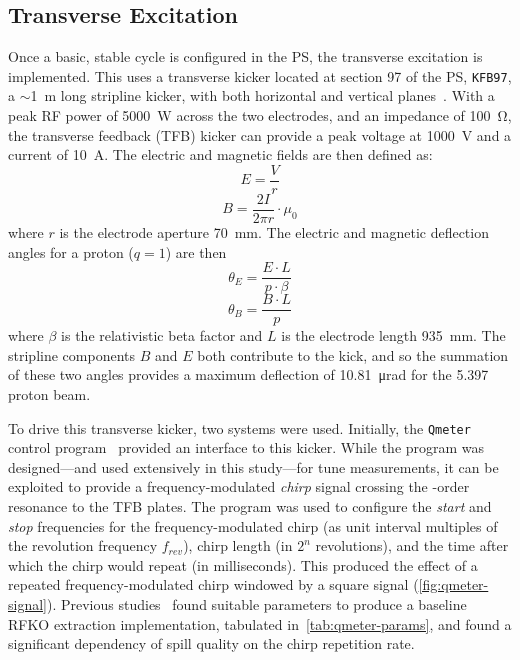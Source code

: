 \documentclass[a4paper,twoside,11pt]{report}
\begin{document}
\subsection{Transverse Excitation}\label{sec:trans_exc}
Once a basic, stable cycle is configured in the PS, the transverse excitation is implemented. This uses a transverse kicker located at section 97 of the PS, \verb|KFB97|, a $\sim$\qty{1}{\meter} long stripline kicker, with both horizontal and vertical planes~\cite{Sterbini:2158994}. With a peak RF power of \qty{5000}{\watt} across the two electrodes, and an impedance of \qty{100}{\ohm}, the transverse feedback (TFB) kicker can provide a peak voltage at \qty{1000}{\volt} and a current of \qty{10}{\ampere}. The electric and magnetic fields are then defined as:
\begin{equation}
  E=\frac Vr
\end{equation}
\begin{equation}
  B=\frac {2I}{2\pi r}\cdot \mu_0
\end{equation}
where $r$ is the electrode aperture \qty{70}{\milli\meter}. The electric and magnetic deflection angles for a proton ($q=1$) are then~\cite[3.1-3.2]{bouvet}
\begin{equation}
  \theta_E = \frac{E \cdot L}{p\cdot\beta}
  \label{eq:kick-electric}
\end{equation}
\begin{equation}
  \theta_B = \frac{B\cdot L}{p}
  \label{eq:kick-magnetic}
\end{equation} where $\beta$ is the relativistic beta factor and $L$ is the electrode length \qty{935}{\milli\meter}. The stripline components $B$ and $E$ both contribute to the kick, and so the summation of these two angles provides a maximum deflection of \qty{10.81}{\micro\radian} for the \qty{5.397}{\giga\eVperc} proton beam.

To drive this transverse kicker, two systems were used. Initially, the \verb|Qmeter| control program~\cite{Gasior:895142} provided an interface to this kicker. While the program was designed---and used extensively in this study---for tune measurements, it can be exploited to provide a frequency-modulated \textit{chirp} signal crossing the -order resonance to the TFB plates. The program was used to configure the \textit{start} and \textit{stop} frequencies for the frequency-modulated chirp (as unit interval multiples of the revolution frequency $f_{rev}$), chirp length (in $2^n$ revolutions), and the time after which the chirp would repeat (in milliseconds). This produced the effect of a repeated frequency-modulated chirp windowed by a square signal (\autoref{fig:qmeter-signal}). Previous studies~\cite{ipac} found suitable parameters to produce a baseline RFKO extraction implementation, tabulated in~\autoref{tab:qmeter-params}, and found a significant dependency of spill quality on the chirp repetition rate.
\end{document}
